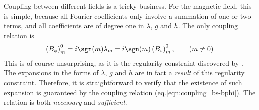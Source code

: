 Coupling between different fields is a tricky business. For the magnetic field, this is simple, because all Fourier coefficients only involve a summation of one or two terms, and all coefficients are of degree one in $\lambda$, $g$ and $h$. The only coupling relation is
\begin{equation}\label{eqn:coupling_bs-bphi}
    \left(B_\phi\right)_m^0 = i \sgn(m) \lambda_m = i \sgn(m) \left(B_s\right)_m^0,\qquad (m\neq 0)
\end{equation}
This is of course unsurprising, as it is the regularity constraint discovered by \textcite{lewis_physical_1990}. The expansions in the forms of $\lambda$, $g$ and $h$ are in fact a \textit{result} of this regularity constraint. Therefore, it is straightforward to verify that the existence of such expansion is guaranteed by the coupling relation (eq.\ref{eqn:coupling_bs-bphi}). The relation is both \textit{necessary} and \textit{sufficient}.

